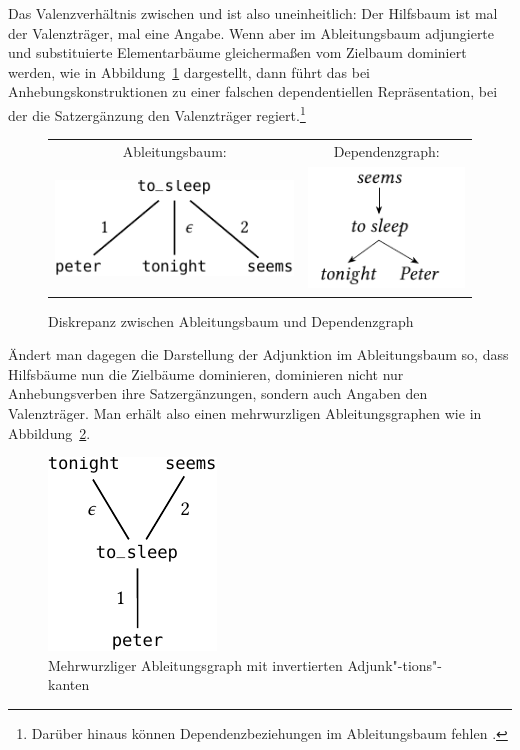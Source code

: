 Das Valenzverhältnis zwischen  und  ist also uneinheitlich: Der Hilfsbaum ist mal der Valenzträger, mal eine Angabe. Wenn aber im Ableitungsbaum adjungierte und substituierte Elementarbäume gleicherma\ss en vom Zielbaum dominiert werden, wie in Abbildung~\ref{fig-TAG-raising2} dargestellt, dann führt das bei Anhebungskonstruktionen zu einer falschen dependentiellen Repräsentation, bei der die Satzergänzung den Valenzträger regiert.\footnote{Darüber hinaus können Dependenzbeziehungen im Ableitungsbaum fehlen \citep{Rambow:etal:95}.}
\begin{figure}[t]
\centering
\begin{tabular}{cc}
Ableitungsbaum: & Dependenzgraph: \\[2ex]
\includegraphics{graphics/abb512a.pdf}
&
\includegraphics{graphics/abb512b.pdf}
\end{tabular}
\caption{\label{fig-TAG-raising2}Diskrepanz zwischen Ableitungsbaum und Dependenzgraph}
\end{figure} 
Ändert man dagegen die Darstellung der Adjunktion im Ableitungsbaum so, dass Hilfsbäume nun die Zielbäume dominieren, dominieren nicht nur Anhebungsverben ihre Satzergänzungen, sondern auch Angaben den Valenzträger. Man erhält also einen mehrwurzligen Ableitungsgraphen wie in Abbildung~\ref{fig-TAG-raising3}.
\begin{figure}[t]
\centering
\includegraphics{graphics/abb513.pdf}
\caption{\label{fig-TAG-raising3}Mehrwurzliger Ableitungsgraph mit invertierten Adjunk"-tions"-kanten}
\end{figure} 
